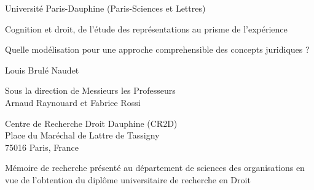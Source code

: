 
\begin{titlepage}
\begin{center}
{Université Paris-Dauphine (Paris-Sciences et Lettres)} \vspace{1.5 cm}\\
\end{center}
\begin{center}
\Huge{Cognition et droit, de l'étude des représentations au prisme de l'expérience}
\end{center}
\vspace{0cm}
\begin{center}
\Large{Quelle modélisation pour une approche comprehensible des concepts juridiques ?}
\end{center}
\vspace{1.0 cm}
\begin{center}
\normalsize{Louis Brulé Naudet}
\vspace{1.5 cm}

\normalsize{Sous la direction de Messieurs les Professeurs\\}
\normalsize{Arnaud Raynouard et Fabrice Rossi}
\vspace{2.0 cm}

\end{center}
\begin{center}
Centre de Recherche Droit Dauphine (CR2D)\\
Place du Maréchal de Lattre de Tassigny\\
75016 Paris, France
\end{center}
\vspace{1.0 cm}
\begin{center}
Mémoire de recherche présenté au département de sciences des organisations en vue de l'obtention du diplôme universitaire de recherche en Droit
\end{center}
\vspace{1.5 cm}
\end{titlepage}
\emptypage
\nobibliography*
